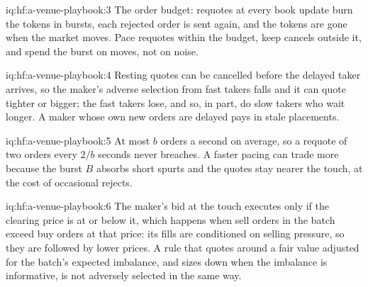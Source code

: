 \begin{solution}{iq:hf:a-venue-playbook:3}
The order budget: requotes at every book update burn the tokens in bursts, each rejected order is sent again, and the tokens are gone when the market
moves. Pace requotes within the budget, keep cancels outside it, and spend the burst on moves, not on noise.
\end{solution}

\begin{solution}{iq:hf:a-venue-playbook:4}
Resting quotes can be cancelled before the delayed taker arrives, so the maker's adverse selection from fast takers falls and it can quote tighter
or bigger; the fast takers lose, and so, in part, do slow takers who wait longer. A maker whose own new orders are delayed pays in stale placements.
\end{solution}

\begin{solution}{iq:hf:a-venue-playbook:5}
At most $b$ orders a second on average, so a requote of two orders every $2/b$ seconds never breaches. A faster pacing can trade more because the
burst $B$ absorbs short spurts and the quotes stay nearer the touch, at the cost of occasional rejects.
\end{solution}

\begin{solution}{iq:hf:a-venue-playbook:6}
The maker's bid at the touch executes only if the clearing price is at or below it, which happens when sell orders in the batch exceed buy orders at
that price: its fills are conditioned on selling pressure, so they are followed by lower prices. A rule that quotes around a fair value adjusted for
the batch's expected imbalance, and sizes down when the imbalance is informative, is not adversely selected in the same way.
\end{solution}

